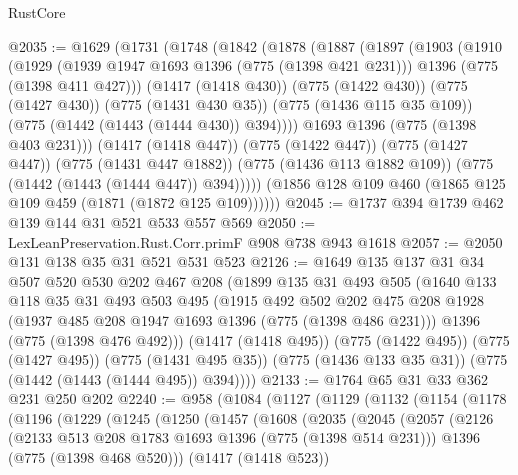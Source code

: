 \begin{lexlean}{RustCore}
\begin{coremodule}
@2035 := @1629
    (@1731
      (@1748
        (@1842
          (@1878
            (@1887
              (@1897
                (@1903
                  (@1910
                    (@1929
                      (@1939 @1947 @1693 @1396 (@775 (@1398 @421 @231)))
                      @1396
                      (@775 (@1398 @411 @427)))
                    (@1417 (@1418 @430))
                    (@775 (@1422 @430))
                    (@775 (@1427 @430))
                    (@775 (@1431 @430 @35))
                    (@775 (@1436 @115 @35 @109))
                    (@775 (@1442 (@1443 (@1444 @430)) @394))))
                @1693
                @1396
                (@775 (@1398 @403 @231)))
              (@1417 (@1418 @447))
              (@775 (@1422 @447))
              (@775 (@1427 @447))
              (@775 (@1431 @447 @1882))
              (@775 (@1436 @113 @1882 @109))
              (@775 (@1442 (@1443 (@1444 @447)) @394)))))
        (@1856 @128 @109 @460 (@1865 @125 @109 @459 (@1871 (@1872 @125 @109))))))
@2045 := @1737 @394 @1739 @462 @139 @144 @31 @521 @533 @557 @569
@2050 := LexLeanPreservation.Rust.Corr.primF @908 @738 @943 @1618
@2057 := @2050 @131 @138 @35 @31 @521 @531 @523
@2126 := @1649
    @135
    @137
    @31
    @34
    @507
    @520
    @530
    @202
    @467
    @208
    (@1899
      @135
      @31
      @493
      @505
      (@1640
        @133
        @118
        @35
        @31
        @493
        @503
        @495
        (@1915
          @492
          @502
          @202
          @475
          @208
          @1928
          (@1937 @485 @208 @1947 @1693 @1396 (@775 (@1398 @486 @231)))
          @1396
          (@775 (@1398 @476 @492)))
        (@1417 (@1418 @495))
        (@775 (@1422 @495))
        (@775 (@1427 @495))
        (@775 (@1431 @495 @35))
        (@775 (@1436 @133 @35 @31))
        (@775 (@1442 (@1443 (@1444 @495)) @394))))
@2133 := @1764 @65 @31 @33 @362 @231 @250 @202
@2240 := @958
    (@1084
      (@1127
        (@1129
          (@1132
            (@1154
              (@1178
                (@1196
                  (@1229
                    (@1245
                      (@1250
                        (@1457
                          (@1608
                            (@2035
                              (@2045
                                (@2057
                                  (@2126
                                    (@2133 @513 @208 @1783 @1693 @1396 (@775 (@1398 @514 @231)))
                                    @1396
                                    (@775 (@1398 @468 @520)))
                                  (@1417 (@1418 @523))

\end{coremodule}
\end{lexlean}
